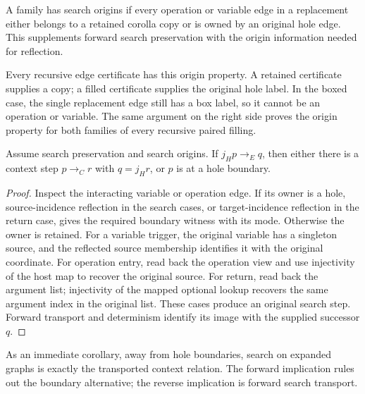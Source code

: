 \begin{definition}\label{term:search-origins}
A family has search origins if every operation or variable edge in a replacement
either belongs to a retained corolla copy or is owned by an original hole edge.
This supplements forward search preservation with the origin information needed
for reflection.
\end{definition}
Every recursive edge certificate has this origin property. A retained certificate
supplies a copy; a filled certificate supplies the original hole label. In the
boxed case, the single replacement edge still has a box label, so it cannot be
an operation or variable. The same argument on the right side proves the origin
property for both families of every recursive paired filling.

\begin{theorem}
Assume search preservation and search origins. If $j_Hp\longrightarrow_E q$,
then either there is a context step $p\longrightarrow_C r$ with $q=j_Hr$, or
$p$ is at a hole boundary.
\end{theorem}
\begin{proof}
Inspect the interacting variable or operation edge. If its owner is a hole,
source-incidence reflection in the search cases, or target-incidence reflection
in the return case, gives the required boundary witness with its mode.
Otherwise the owner is retained. For a variable trigger, the original variable
has a singleton source, and the reflected source membership identifies it with
the original coordinate. For operation entry, read back the operation view and
use injectivity of the host map to recover the original source. For return,
read back the argument list; injectivity of the mapped optional lookup recovers
the same argument index in the original list. These cases produce an original
search step. Forward transport and determinism identify its image with the
supplied successor $q$.
\end{proof}
As an immediate corollary, away from hole boundaries, search on expanded graphs
is exactly the transported context relation. The forward implication rules out
the boundary alternative; the reverse implication is forward search transport.

